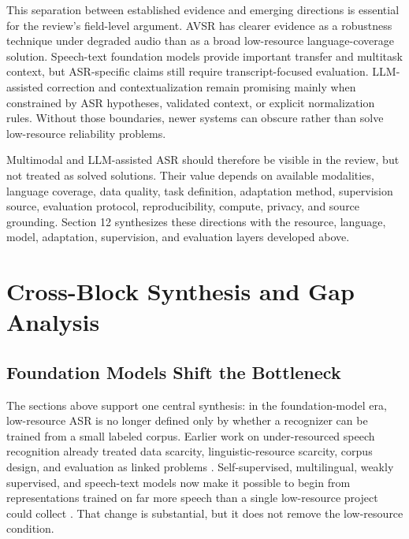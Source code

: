 \documentclass[pdflatex,sn-basic]{sn-jnl}
\theoremstyle{thmstyleone}
\theoremstyle{thmstyletwo}
\theoremstyle{thmstylethree}
\begin{document}
This separation between established evidence and emerging directions is essential for the review's field-level argument. AVSR has clearer evidence as a robustness technique under degraded audio than as a broad low-resource language-coverage solution. Speech-text foundation models provide important transfer and multitask context, but ASR-specific claims still require transcript-focused evaluation. LLM-assisted correction and contextualization remain promising mainly when constrained by ASR hypotheses, validated context, or explicit normalization rules. Without those boundaries, newer systems can obscure rather than solve low-resource reliability problems.

Multimodal and LLM-assisted ASR should therefore be visible in the review, but not treated as solved solutions. Their value depends on available modalities, language coverage, data quality, task definition, adaptation method, supervision source, evaluation protocol, reproducibility, compute, privacy, and source grounding. Section 12 synthesizes these directions with the resource, language, model, adaptation, supervision, and evaluation layers developed above.

\section{Cross-Block Synthesis and Gap Analysis}

\subsection{Foundation Models Shift the Bottleneck}

The sections above support one central synthesis: in the foundation-model era, low-resource ASR is no longer defined only by whether a recognizer can be trained from a small labeled corpus. Earlier work on under-resourced speech recognition already treated data scarcity, linguistic-resource scarcity, corpus design, and evaluation as linked problems \citep{besacier2014_underresourced_asr_survey,gales2014_babel_project_research_cued}. Self-supervised, multilingual, weakly supervised, and speech-text models now make it possible to begin from representations trained on far more speech than a single low-resource project could collect \citep{baevski2020wav2vec2,babu22_interspeech,pmlr-v202-radford23a,pratap2024mms,seamless2025_joint_speech_text_mt,tian25b_interspeech}. That change is substantial, but it does not remove the low-resource condition.
\end{document}
